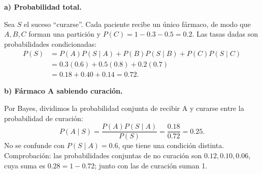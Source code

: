 \textbf{a) Probabilidad total.}\par\nopagebreak[4]
Sea $S$ el suceso ``curarse''. Cada paciente recibe un único fármaco, de modo que $A,B,C$ forman una partición y $P(C)=1-0.3-0.5=0.2$. Las tasas dadas son probabilidades condicionadas:
\[
\begin{aligned}
P(S)&=P(A)P(S\mid A)+P(B)P(S\mid B)+P(C)P(S\mid C)\\
&=0.3(0.6)+0.5(0.8)+0.2(0.7)\\
&=0.18+0.40+0.14=\boxed{0.72}.
\end{aligned}
\]

\textbf{b) Fármaco A sabiendo curación.}\par\nopagebreak[4]
Por Bayes, dividimos la probabilidad conjunta de recibir A y curarse entre la probabilidad de curación:
\[
P(A\mid S)=\frac{P(A)P(S\mid A)}{P(S)}
=\frac{0.18}{0.72}=\boxed{0.25}.
\]
No se confunde con $P(S\mid A)=0.6$, que tiene una condición distinta. Comprobación: las probabilidades conjuntas de no curación son $0.12,0.10,0.06$, cuya suma es $0.28=1-0.72$; junto con las de curación suman 1.
